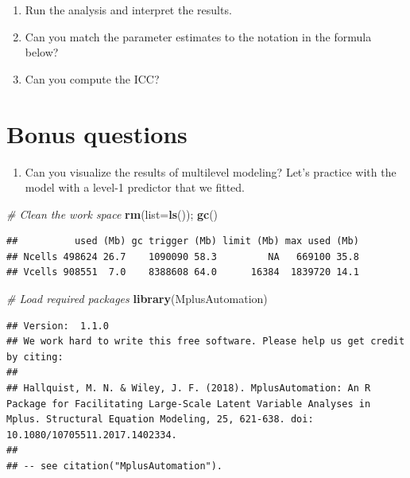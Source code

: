 \documentclass[
]{book}
\newenvironment{Shaded}{\begin{snugshade}}{\end{snugshade}}
\newcommand{\AttributeTok}[1]{\textcolor[rgb]{0.13,0.29,0.53}{#1}}
\newcommand{\CommentTok}[1]{\textcolor[rgb]{0.56,0.35,0.01}{\textit{#1}}}
\newcommand{\FunctionTok}[1]{\textcolor[rgb]{0.13,0.29,0.53}{\textbf{#1}}}
\newcommand{\NormalTok}[1]{#1}
\providecommand{\tightlist}{%
  \setlength{\itemsep}{0pt}\setlength{\parskip}{0pt}}
\begin{document}
\begin{enumerate}
\def\labelenumi{\arabic{enumi}.}
\setcounter{enumi}{1}
\item
  Run the analysis and interpret the results.
\item
  Can you match the parameter estimates to the notation in the formula below?
\item
  Can you compute the ICC?
\end{enumerate}

\hypertarget{bonus-questions-3}{%
\section{Bonus questions}\label{bonus-questions-3}}

\begin{enumerate}
\def\labelenumi{\arabic{enumi}.}
\tightlist
\item
  Can you visualize the results of multilevel modeling? Let's practice with the model with a level-1 predictor that we fitted.
\end{enumerate}

\begin{Shaded}
\begin{Highlighting}[]
\CommentTok{\# Clean the work space}
\FunctionTok{rm}\NormalTok{(}\AttributeTok{list=}\FunctionTok{ls}\NormalTok{()); }\FunctionTok{gc}\NormalTok{()}
\end{Highlighting}
\end{Shaded}

\begin{verbatim}
##          used (Mb) gc trigger (Mb) limit (Mb) max used (Mb)
## Ncells 498624 26.7    1090090 58.3         NA   669100 35.8
## Vcells 908551  7.0    8388608 64.0      16384  1839720 14.1
\end{verbatim}

\begin{Shaded}
\begin{Highlighting}[]
\CommentTok{\# Load required packages}
\FunctionTok{library}\NormalTok{(MplusAutomation)}
\end{Highlighting}
\end{Shaded}

\begin{verbatim}
## Version:  1.1.0
## We work hard to write this free software. Please help us get credit by citing: 
## 
## Hallquist, M. N. & Wiley, J. F. (2018). MplusAutomation: An R Package for Facilitating Large-Scale Latent Variable Analyses in Mplus. Structural Equation Modeling, 25, 621-638. doi: 10.1080/10705511.2017.1402334.
## 
## -- see citation("MplusAutomation").
\end{verbatim}
\end{document}
